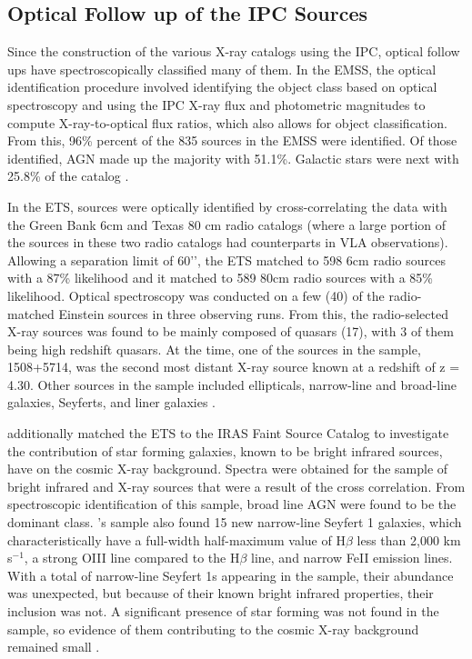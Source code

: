 \FloatBarrier

\subsection{Optical Follow up of the IPC Sources}


Since the construction of the various X-ray catalogs using the IPC, optical follow ups have spectroscopically classified many of them. 
In the EMSS, the optical identification procedure involved identifying the object class based on optical spectroscopy and using the IPC X-ray flux and photometric magnitudes to compute X-ray-to-optical flux ratios, which also allows for object classification.
From this, 96\% percent of the 835 sources in the EMSS were identified. 
Of those identified, AGN made up the majority with 51.1\%. 
Galactic stars were next with 25.8\% of the catalog \citep{stocke1991}.

In the ETS, sources were optically identified by cross-correlating the data with the Green Bank 6cm and Texas 80 cm radio catalogs (where a large portion of the sources in these two radio catalogs had counterparts in VLA observations).
Allowing a separation limit of 60’’, the ETS matched to 598 6cm radio sources with a 87\% likelihood and it matched to 589 80cm radio sources with a 85\% likelihood. 
Optical spectroscopy was conducted on a few (40) of the radio-matched Einstein sources in three observing runs.
From this, the radio-selected X-ray sources was found to be mainly composed of quasars (17), with 3 of them being high redshift quasars.
At the time, one of the sources in the sample, 1508+5714, was the second most distant X-ray source known at a redshift of z = 4.30.
Other sources in the sample included ellipticals, narrow-line and broad-line galaxies, Seyferts, and liner galaxies \citep{moran1996}.

\cite{moran1996} additionally matched the ETS to the IRAS Faint Source Catalog to investigate the contribution of star forming galaxies, known to be bright infrared sources, have on the cosmic X-ray background. 
Spectra were obtained for the sample of bright infrared and X-ray sources that were a result of the cross correlation.
From spectroscopic identification of this sample, broad line AGN were found to be the dominant class.
\cite{moran1996}'s sample also found 15 new narrow-line Seyfert 1 galaxies, which characteristically have a full-width half-maximum value of H$\beta$ less than 2,000 km s$^{-1}$, a strong OIII line compared to the H$\beta$ line, and narrow FeII emission lines.
With a total of narrow-line Seyfert 1s appearing in the sample, their abundance was unexpected, but because of their known bright infrared properties, their inclusion was not.
A significant presence of star forming was not found in the sample, so evidence of them contributing to the cosmic X-ray background remained small \citep{moran1996}.



